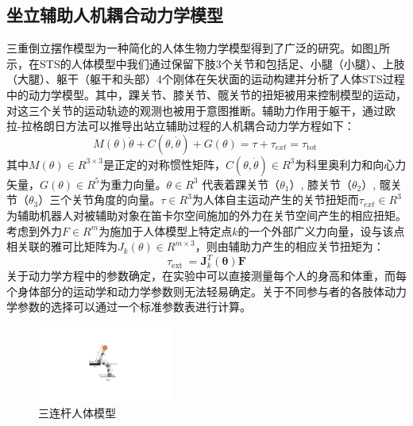 \subsection{坐立辅助人机耦合动力学模型}  
三重倒立摆作模型为一种简化的人体生物力学模型得到了广泛的研究。如图\ref{fig:4-1}所示，在STS的人体模型中我们通过保留下肢3个关节和包括足、小腿（小腿）、上肢（大腿）、躯干（躯干和头部）4个刚体在矢状面的运动构建并分析了人体STS过程中的动力学模型。其中，踝关节、膝关节、髋关节的扭矩被用来控制模型的运动，对这三个关节的运动轨迹的观测也被用于意图推断。辅助力作用于躯干，通过欧拉-拉格朗日方法可以推导出站立辅助过程的人机耦合动力学方程如下：
\begin{equation}
    M(\theta) \ddot{\theta}+C(\theta, \dot{\theta})+G(\theta)=\tau+\tau_{e x t}=\tau_{\text {tot }}
    \label{eq:4-1}
\end{equation}
其中$M(\theta)\in R^{3\times 3}$是正定的对称惯性矩阵，$C(\theta, \dot{\theta})\in R^3$为科里奥利力和向心力矢量，$G(\theta)\in R^5$为重力向量。$\theta \in R^3$ 代表着踝关节（$\theta_1$）, 膝关节（$\theta_2$）, 髋关节（$\theta_3$）三个关节角度的向量。$\tau \in R^3$为人体自主运动产生的关节扭矩而$\tau_{ext} \in R^3$为辅助机器人对被辅助对象在笛卡尔空间施加的外力在关节空间产生的相应扭矩。考虑到外力$F\in R^m$为施加于人体模型上特定点$k$的一个外部广义力向量，设与该点相关联的雅可比矩阵为$J_k(\theta)\in R^{m\times 3}$，则由辅助力产生的相应关节扭矩为：
\begin{equation}
    \tau_{\text {ext }}=\boldsymbol{J}_k^T(\boldsymbol{\theta}) \boldsymbol{F}
    \label{eq:4-2}
\end{equation}
关于动力学方程中的参数确定，在实验中可以直接测量每个人的身高和体重，而每个身体部分的运动学和动力学参数则无法轻易确定。关于不同参与者的各肢体动力学参数的选择可以通过一个标准参数表进行计算\cite{tozerenHumanBodyDynamics2000}。

\begin{figure}[!t]
    \centering\includegraphics[width=0.4\textwidth]{figures/4-Fig-1.pdf}
    \caption{三连杆人体模型}
    \label{fig:4-1}
\end{figure}
